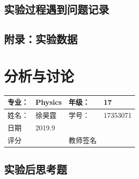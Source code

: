 \documentclass{ctexart}
\begin{document}
	\subsection{实验过程遇到问题记录}
	
	\subsection{附录：实验数据}




\newpage
\section{分析与讨论}
\begin{tabular}{|p{8em}|p{8em}|p{8em}|p{8em}|}
	\hline 
	专业：     &Physics       &年级：      & 17     \\
	\hline
	姓名：& 徐昊霆 &学号：&17353071  \\
	\hline
	日期&     2019.9               & &  \\
	\hline	
	评分 & & 教师签名 & \\
	\hline
\end{tabular}





\subsection{实验后思考题}




\end{document}
